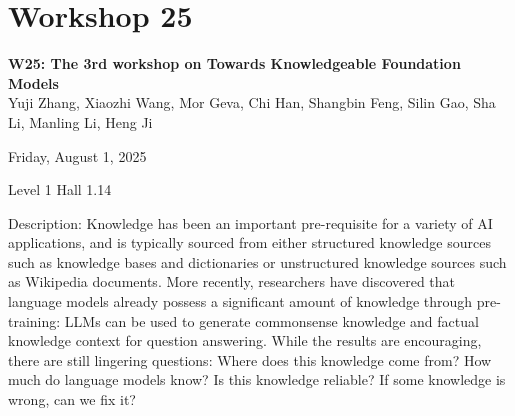\clearpage


\section[W25: The 3rd workshop on Towards Knowledgeable Foundation Models]{Workshop 25}
\label{workshop_25}

\begin{center}
    {\Large \textbf{W25: The 3rd workshop on Towards Knowledgeable Foundation Models}}\\

Yuji Zhang, Xiaozhi Wang, Mor Geva, Chi Han, Shangbin Feng, Silin Gao, Sha Li, Manling Li, Heng Ji

    Friday, August 1, 2025

 Level 1 Hall 1.14
    
\end{center}

Description: Knowledge has been an important pre-requisite for a variety of AI applications, and is typically sourced from either structured knowledge sources such as knowledge bases and dictionaries or unstructured knowledge sources such as Wikipedia documents. More recently, researchers have discovered that language models already possess a significant amount of knowledge through pre-training: LLMs can be used to generate commonsense knowledge and factual knowledge context for question answering. While the results are encouraging, there are still lingering questions: Where does this knowledge come from? How much do language models know? Is this knowledge reliable? If some knowledge is wrong, can we fix it?

